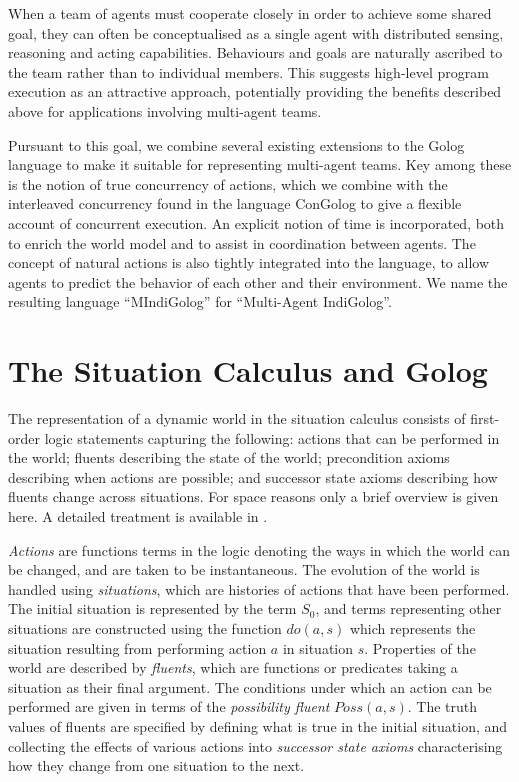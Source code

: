 \documentclass[letterpaper]{article}
\begin{document}
When a team of agents must cooperate closely in order to achieve some
shared goal, they can often be conceptualised as a single agent with
distributed sensing, reasoning and acting capabilities. Behaviours
and goals are naturally ascribed to the team rather than to individual
members.
This suggests high-level program execution as an attractive
approach, potentially providing the benefits described above for applications
involving multi-agent teams.

Pursuant to this goal, we combine several existing extensions to the
Golog language to make it suitable for representing multi-agent teams.
Key among these is the notion of true concurrency of actions, which
we combine with the interleaved concurrency found in the language
ConGolog \cite{giacomo00congolog} to give a flexible account of concurrent
execution. An explicit notion of time is incorporated, both to enrich
the world model and to assist in coordination between agents. The
concept of natural actions \cite{reiter96sc_nat_conc} is also tightly
integrated into the language, to allow agents to predict the behavior
of each other and their environment. We name the resulting language
``MIndiGolog'' for ``Multi-Agent IndiGolog''.

\section{The Situation Calculus and Golog}

The representation of a dynamic world in the situation calculus consists
of first-order logic statements capturing the following: actions that
can be performed in the world; fluents describing the state of the
world; precondition axioms describing when actions are possible; and
successor state axioms describing how fluents change across situations.
For space reasons only a brief overview is given here.
A detailed treatment
is available in \cite{pirri99contributions_sitcalc}.

\emph{Actions} are functions terms in the logic denoting the ways
in which the world can be changed, and are taken to be instantaneous.
The evolution of the world is handled using \emph{situations}, which
are histories of actions that have been performed. The initial situation
is represented by the term $S_{0}$, and terms representing other situations
are constructed using the function $do(a,s)$ which represents the
situation resulting from performing action $a$ in situation $s$.
Properties of the world are described by \emph{fluents}, which are
functions or predicates taking a situation as their final argument.
The conditions under which an action can be performed are given in
terms of the \emph{possibility fluent} $Poss(a,s)$. The truth values
of fluents are specified by defining what is true in the initial situation,
and collecting the effects of various actions into \emph{successor
state axioms} characterising how they change from one situation to
the next.
\end{document}
